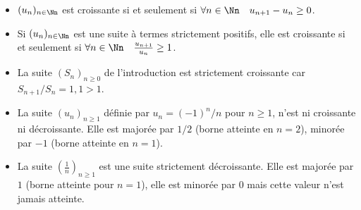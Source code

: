 \documentclass[class=report,crop=false]{standalone}
\begin{document}
\begin{remarque*}
\sauteligne
    \begin{itemize}
      \item $(u_n)_{n\in \Nn}$ est croissante si et seulement si $\forall n\in \Nn \quad  u_{n+1}-u_n \geq 0$.
      \item Si $(u_n)_{n\in \Nn}$ est une suite à termes strictement positifs, elle est
croissante si et seulement si $\forall n\in \Nn \quad \frac{u_{n+1}}{u_n} \geq 1$.
    \end{itemize}
\end{remarque*}
\begin{exemple}
\sauteligne
    \begin{itemize}
      \item La suite $(S_n)_{n\geq 0}$ de l'introduction est strictement croissante car $S_{n+1}/S_n=1,1>1$.
      \item La suite $(u_n)_{n\geq 1}$ définie par $u_n=(-1)^n/n$ pour $n\geq 1$,
n'est ni croissante ni décroissante. Elle est majorée par $1/2$ (borne atteinte en $n=2$), minorée par $-1$ (borne atteinte en $n=1$).


      \item La suite $\left(\frac1n\right)_{n\geq1}$ est une suite strictement décroissante. Elle est majorée par $1$
      (borne atteinte pour $n=1$), elle est minorée par $0$ mais cette valeur n'est jamais atteinte.
    \end{itemize}
\end{exemple}



\end{document}
